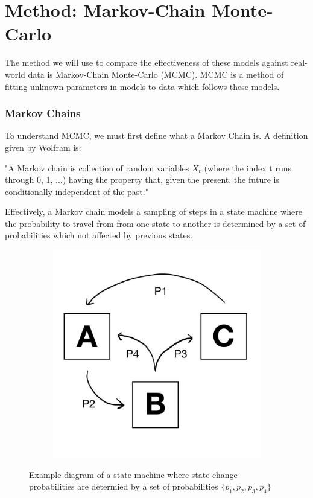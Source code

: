 \documentclass [letterpaper, 12pt] {article}
\begin{document}
\pagebreak

\section{Method: Markov-Chain Monte-Carlo}

The method we will use to compare the effectiveness of these models against real-world data is Markov-Chain Monte-Carlo (MCMC). MCMC is a method of fitting unknown parameters in models to data which follows these models.

\subsubsection{Markov Chains}
To understand MCMC, we must first define what a Markov Chain is. A definition given by Wolfram is:

"A Markov chain is collection of random variables ${X_t}$ (where the index t runs through 0, 1, ...) having the property that, given the present, the future is conditionally independent of the past." \cite{weisstein}

Effectively, a Markov chain models a sampling of steps in a state machine where the probability to travel from from one state to another is determined by a set of probabilities which not affected by previous states.

\begin{figure}[H]
	\centering
	\begin{subfigure}{0.5\textwidth}
		\includegraphics[width=\textwidth]{state_machine.jpg}
	\end{subfigure}
	\caption{Example diagram of a state machine where state change probabilities are determied by a set of probabilities $\{p_1, p_2, p_3, p_4\}$} 
\end{figure}
\end{document}
